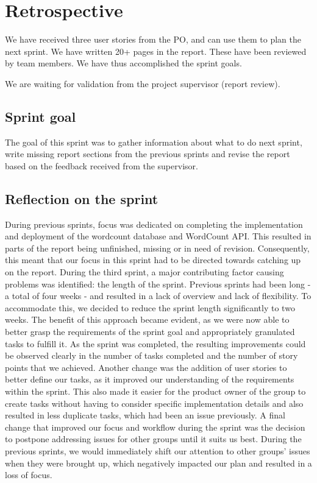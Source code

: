 \section{Retrospective}
We have received three user stories from the PO, and can use them to plan the next sprint.  We have written 20+ pages in the report. These have been reviewed by team members.  We have thus accomplished the sprint goals. 

We are waiting for validation from the project supervisor (report review).

\subsection{Sprint goal}
The goal of this sprint was to gather information about what to do next sprint, write missing report sections from the previous sprints and revise the report based on the feedback received from the supervisor. 

\subsection{Reflection on the sprint}
During previous sprints, focus was dedicated on completing the implementation and deployment of the wordcount database and WordCount API. This resulted in parts of the report being unfinished, missing or in need of revision. Consequently, this meant that our focus in this sprint had to be directed towards catching up on the report.
During the third sprint, a major contributing factor causing problems was identified: the length of the sprint. Previous sprints had been long - a total of four weeks - and resulted in a lack of overview and lack of flexibility. To accommodate this, we decided to reduce the sprint length significantly to two weeks. The benefit of this approach became evident, as we were now able to better grasp the requirements of the sprint goal and appropriately granulated tasks to fulfill it. As the sprint was completed, the resulting improvements could be observed clearly in the number of tasks completed and the number of story points that we achieved. 
Another change was the addition of user stories to better define our tasks, as it improved our understanding of the requirements within the sprint. This also made it easier for the product owner of the group to create tasks without having to consider specific implementation details and also resulted in less duplicate tasks, which had been an issue previously.
A final change that improved our focus and workflow during the sprint was the decision to postpone addressing issues for other groups until it suits us best. During the previous sprints, we would immediately shift our attention to other groups' issues when they were brought up, which negatively impacted our plan and resulted in a loss of focus.

